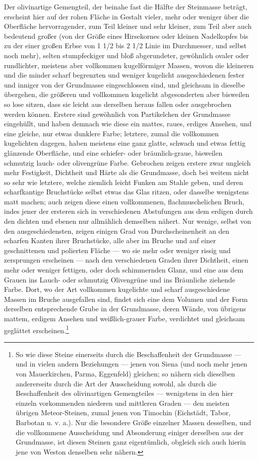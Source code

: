 \documentclass[a4paper, 11pt, oneside, german]{article}
\begin{document}
Der olivinartige Gemengteil, der beinahe fast die Hälfte der Steinmasse beträgt, erscheint hier auf der rohen Fläche in Gestalt vieler, mehr oder weniger über die Oberfläche hervorragender, zum Teil kleiner und sehr kleiner, zum Teil aber auch bedeutend großer (von der Größe eines Hirsekornes oder kleinen Nadelkopfes bis zu der einer großen Erbse von 1 1/2 bis 2 1/2 Linie im Durchmesser, und selbst noch mehr), selten stumpfeckiger und bloß abgerundeter, gewöhnlich ovaler oder rundlichter, meistens aber vollkommen kugelförmiger Massen, wovon die kleineren und die minder scharf begrenzten und weniger kugelicht ausgeschiedenen fester und inniger von der Grundmasse eingeschlossen sind, und gleichsam in dieselbe übergehen, die größeren und vollkommen kugelicht abgesonderten aber bisweilen so lose sitzen, dass sie leicht aus derselben heraus fallen oder ausgebrochen werden können. Erstere sind gewöhnlich von Partikelchen der Grundmasse eingehüllt, und haben demnach wie diese ein mattes, raues, erdiges Ansehen, und eine gleiche, nur etwas dunklere Farbe; letztere, zumal die vollkommen kugelichten dagegen, haben meistens eine ganz glatte, schwach und etwas fettig glänzende Oberfläche, und eine schiefer- oder bräunlich-graue, bisweilen schmutzig lauch- oder olivengrüne Farbe. Gebrochen zeigen erstere zwar ungleich mehr Festigkeit, Dichtheit und Härte als die Grundmasse, doch bei weitem nicht so sehr wie letztere, welche ziemlich leicht Funken am Stahle geben, und deren scharfkantige Bruchstücke selbst etwas das Glas ritzen, oder dasselbe wenigstens matt machen; auch zeigen diese einen vollkommenen, flachmuschelichen Bruch, indes jener der ersteren sich in verschiedenen Abstufungen aus dem erdigen durch den dichten und ebenen nur allmählich demselben nähert. Nur wenige, selbst von den ausgeschiedensten, zeigen einigen Grad von Durchscheinenheit an den scharfen Kanten ihrer Bruchstücke, alle aber im Bruche und auf einer geschnittenen und polierten Fläche --- wo sie mehr oder weniger rissig und zersprungen erscheinen --- nach den verschiedenen Graden ihrer Dichtheit, einen mehr oder weniger fettigen, oder doch schimmernden Glanz, und eine aus dem Grauen ins Lauch- oder schmutzig Olivengrüne und ins Bräunliche ziehende Farbe. Dort, wo der Art vollkommen kugelichte und scharf ausgeschiedene Massen im Bruche ausgefallen sind, findet sich eine dem Volumen und der Form derselben entsprechende Grube in der Grundmasse, deren Wände, von übrigens mattem, erdigem Ansehen und weißlich-grauer Farbe, verdichtet und gleichsam geglättet erscheinen.\footnote{So wie diese Steine einerseits durch die Beschaffenheit der Grundmasse --- und in vielen andern Beziehungen --- jenen von Siena (und noch mehr jenen von Mauerkirchen, Parma, Eggenfeld) gleichen; so nähern sich dieselben andererseits durch die Art der Ausscheidung sowohl, als durch die Beschaffenheit des olivinartigen Gemengteiles --- wenigstens in den hier einzeln vorkommenden niederen und mittleren Graden --- den meisten übrigen Meteor-Steinen, zumal jenen von Timochin (Eichstädt, Tabor, Barbotan u. v. a.). Nur die besondere Größe einzelner Massen desselben, und die vollkommene Ausscheidung und Absonderung einiger derselben aus der Grundmasse, ist diesen Steinen ganz eigentümlich, obgleich sich auch hierin jene von Weston denselben sehr nähern.}
\end{document}
